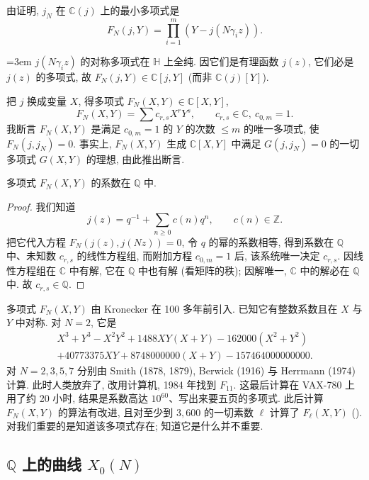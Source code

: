 由证明, $j_N$ 在 $\mathbb{C}(j)$ 上的最小多项式是
\[
F_N(j, Y) = \prod_{i=1}^{m}(Y - j(N\gamma_i z)).
\]
{\emergencystretch=3em $j(N\gamma_i z)$ 的对称多项式在 $\mathbb{H}$ 上全纯. 因它们是有理函数 $j(z)$, 它们必是 $j(z)$ 的多项式, 故 $F_N(j, Y)\in\mathbb{C}[j, Y]$ (而非 $\mathbb{C}(j)[Y]$).\par}

把 $j$ 换成变量 $X$, 得多项式 $F_N(X, Y)\in\mathbb{C}[X, Y]$,
\[
F_N(X, Y) = \sum c_{r,s}X^rY^s, \qquad c_{r,s}\in\mathbb{C}, \ c_{0,m} = 1.
\]
我断言 $F_N(X, Y)$ 是满足 $c_{0,m} = 1$ 的 $Y$ 的次数 $\le m$ 的唯一多项式, 使 $F_N(j, j_N) = 0$. 事实上, $F_N(X, Y)$ 生成 $\mathbb{C}[X, Y]$ 中满足 $G(j, j_N) = 0$ 的一切多项式 $G(X, Y)$ 的理想, 由此推出断言.

\begin{proposition} \label{thm:5.2.4} 
多项式 $F_N(X, Y)$ 的系数在 $\mathbb{Q}$ 中.
\end{proposition}

\begin{proof}
我们知道
\[
j(z) = q^{-1} + \sum_{n\ge 0}c(n)q^n, \qquad c(n)\in\mathbb{Z}.
\]
把它代入方程 $F_N(j(z), j(Nz)) = 0$, 令 $q$ 的幂的系数相等, 得到系数在 $\mathbb{Q}$ 中、未知数 $c_{r,s}$ 的线性方程组, 而附加方程 $c_{0,m} = 1$ 后, 该系统唯一决定 $c_{r,s}$. 因线性方程组在 $\mathbb{C}$ 中有解, 它在 $\mathbb{Q}$ 中也有解 (看矩阵的秩); 因解唯一, $\mathbb{C}$ 中的解必在 $\mathbb{Q}$ 中. 故 $c_{r,s}\in\mathbb{Q}$.
\end{proof}

\begin{aside} \label{thm:5.2.5} 
多项式 $F_N(X, Y)$ 由 Kronecker 在 100 多年前引入. 已知它有整数系数且在 $X$ 与 $Y$ 中对称. 对 $N = 2$, 它是
\begin{align*}
  X^3 + Y^3 - X^2Y^2 + 1488XY(X+Y) - 162000(X^2+Y^2)\\
  + 40773375XY + 8748000000(X+Y) - 157464000000000.
\end{align*}
对 $N = 2, 3, 5, 7$ 分别由 Smith (1878, 1879), Berwick (1916) 与 Herrmann (1974) 计算. 此时人类放弃了, 改用计算机, 1984 年找到 $F_{11}$. 这最后计算在 VAX-780 上用了约 20 小时, 结果是系数高达 $10^{60}$、写出来要五页的多项式. 此后计算 $F_N(X, Y)$ 的算法有改进, 且对至少到 $3{,}600$ 的一切素数 $\ell$ 计算了 $F_\ell(X, Y)$ (\cite{broker2012}). 对我们重要的是知道该多项式存在; 知道它是什么并不重要.
\end{aside}

\subsection*{$\mathbb{Q}$ 上的曲线 $X_0(N)$}

